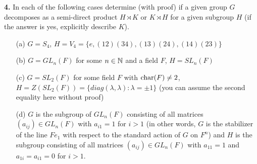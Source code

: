\documentclass[12pt]{amsart}
\begin{document}
{\bf 4.} In each of the following cases determine (with proof) if a given group $G$ decomposes as a semi-direct product
$H\rtimes K$ or $K\rtimes H$ for a given subgroup $H$ (if the answer is yes, explicitly describe $K$).
\begin{itemize}
\item[(a)] $G=S_4$, $H=V_4=\{e,(12)(34), (13)(24), (14)(23)\}$
\item[(b)] $G=GL_n(F)$ for some $n\in{\mathbb N}$ and a field $F$, $H=SL_n(F)$
\item[(c)] $G=SL_2(F)$ for some field $F$ with ${\rm char}(F)\neq 2$, $H=Z(SL_2(F))=\{diag(\lambda,\lambda): \lambda=\pm 1\}$ (you can assume the second equality here without proof)
\item[(d)] $G$ is the subgroup of $GL_n(F)$ consisting of all matrices $(a_{ij})\in GL_n(F)$ with $a_{i1}=1$ for $i>1$ (in other words,
$G$ is the stabilizer of the line $Fe_1$ with respect to the standard action of $G$ on $F^n$) and $H$ is the subgroup consisting
of all matrices $(a_{ij})\in GL_n(F)$ with $a_{11}=1$ and $a_{1i}=a_{i1}=0$ for $i>1$. 
\end{itemize}
\end{document}
